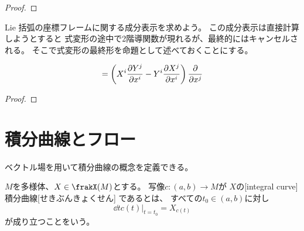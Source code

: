 \documentclass[report]{jlreq}
\begin{document}
\begin{proof}
    \TODO{}
\end{proof}

Lie 括弧の座標フレームに関する成分表示を求めよう。
この成分表示は直接計算しようとすると
式変形の途中で2階導関数が現れるが、最終的にはキャンセルされる。
そこで式変形の最終形を命題として述べておくことにする。

\begin{proposition}
    \begin{equation}
        [X, Y] = \left(
            X^i \deldel[Y^j]{x^i}
            - Y^i \deldel[X^j]{x^i}
        \right)
        \deldel{x^j}
    \end{equation}
    \TODO{}
\end{proposition}

\begin{proof}
    \TODO{}
\end{proof}

%
\section{積分曲線とフロー}

ベクトル場を用いて積分曲線の概念を定義できる。

\begin{definition}[積分曲線]
    $M$を多様体、$X \in \frakX(M)$とする。
    {\smooth}写像$c \colon (a, b) \to M$が
    $X$の[integral curve]{積分曲線}[せきぶんきょくせん]
    であるとは、
    すべての$t_0 \in (a, b)$に対し
    \begin{equation}
        \dd{t} c(t) \Big|_{t = t_0} = X_{c(t)}
    \end{equation}
    が成り立つことをいう。
\end{definition}
\end{document}
